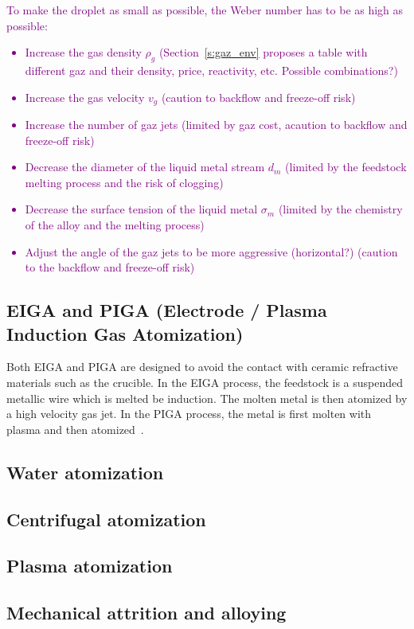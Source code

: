 \textcolor{Purple}{To make the droplet as small as possible, the Weber number has to be as high as possible:
\begin{itemize}
    \item Increase the gas density $\rho_g$ (Section~\ref{s:gaz_env} proposes a table with different gaz and their density, price, reactivity, etc. Possible combinations?)
    \item Increase the gas velocity $v_g$ (caution to backflow and freeze-off risk)
    \item Increase the number of gaz jets (limited by gaz cost, acaution to backflow and freeze-off risk)
    \item Decrease the diameter of the liquid metal stream $d_m$ (limited by the feedstock melting process and the risk of clogging)
    \item Decrease the surface tension of the liquid metal $\sigma_m$ (limited by the chemistry of the alloy and the melting process)
    \item Adjust the angle of the gaz jets to be more aggressive (horizontal?) (caution to the backflow and freeze-off risk)
\end{itemize}}

\subsection{EIGA and PIGA (Electrode / Plasma Induction Gas Atomization)}
Both EIGA and PIGA are designed to avoid the contact with ceramic refractive materials such as the crucible. In the EIGA process, the feedstock is a suspended metallic wire which is melted be induction. The molten metal is then atomized by a high velocity gas jet. In the PIGA process, the metal is first molten with plasma and then atomized~\cite{Kassym2020Atomizationprocesses}. 

\subsection{Water atomization}
\subsection{Centrifugal atomization}
\subsection{Plasma atomization}
\subsection{Mechanical attrition and alloying}
